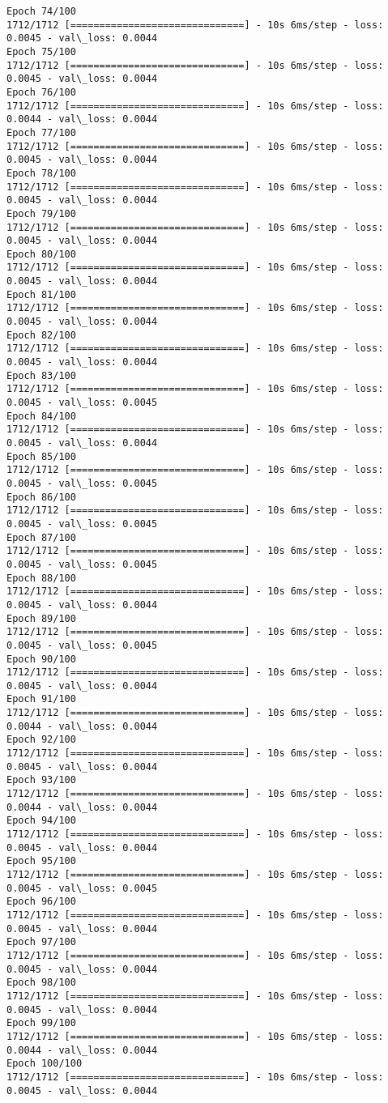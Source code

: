 \documentclass[11pt]{article}
\begin{document}
\begin{Verbatim}[commandchars=\\\{\}]
Epoch 74/100
1712/1712 [==============================] - 10s 6ms/step - loss: 0.0045 - val\_loss: 0.0044
Epoch 75/100
1712/1712 [==============================] - 10s 6ms/step - loss: 0.0045 - val\_loss: 0.0044
Epoch 76/100
1712/1712 [==============================] - 10s 6ms/step - loss: 0.0044 - val\_loss: 0.0044
Epoch 77/100
1712/1712 [==============================] - 10s 6ms/step - loss: 0.0045 - val\_loss: 0.0044
Epoch 78/100
1712/1712 [==============================] - 10s 6ms/step - loss: 0.0045 - val\_loss: 0.0044
Epoch 79/100
1712/1712 [==============================] - 10s 6ms/step - loss: 0.0045 - val\_loss: 0.0044
Epoch 80/100
1712/1712 [==============================] - 10s 6ms/step - loss: 0.0045 - val\_loss: 0.0044
Epoch 81/100
1712/1712 [==============================] - 10s 6ms/step - loss: 0.0045 - val\_loss: 0.0044
Epoch 82/100
1712/1712 [==============================] - 10s 6ms/step - loss: 0.0045 - val\_loss: 0.0044
Epoch 83/100
1712/1712 [==============================] - 10s 6ms/step - loss: 0.0045 - val\_loss: 0.0045
Epoch 84/100
1712/1712 [==============================] - 10s 6ms/step - loss: 0.0045 - val\_loss: 0.0044
Epoch 85/100
1712/1712 [==============================] - 10s 6ms/step - loss: 0.0045 - val\_loss: 0.0045
Epoch 86/100
1712/1712 [==============================] - 10s 6ms/step - loss: 0.0045 - val\_loss: 0.0045
Epoch 87/100
1712/1712 [==============================] - 10s 6ms/step - loss: 0.0045 - val\_loss: 0.0045
Epoch 88/100
1712/1712 [==============================] - 10s 6ms/step - loss: 0.0045 - val\_loss: 0.0044
Epoch 89/100
1712/1712 [==============================] - 10s 6ms/step - loss: 0.0045 - val\_loss: 0.0045
Epoch 90/100
1712/1712 [==============================] - 10s 6ms/step - loss: 0.0045 - val\_loss: 0.0044
Epoch 91/100
1712/1712 [==============================] - 10s 6ms/step - loss: 0.0044 - val\_loss: 0.0044
Epoch 92/100
1712/1712 [==============================] - 10s 6ms/step - loss: 0.0045 - val\_loss: 0.0044
Epoch 93/100
1712/1712 [==============================] - 10s 6ms/step - loss: 0.0044 - val\_loss: 0.0044
Epoch 94/100
1712/1712 [==============================] - 10s 6ms/step - loss: 0.0045 - val\_loss: 0.0044
Epoch 95/100
1712/1712 [==============================] - 10s 6ms/step - loss: 0.0045 - val\_loss: 0.0045
Epoch 96/100
1712/1712 [==============================] - 10s 6ms/step - loss: 0.0045 - val\_loss: 0.0044
Epoch 97/100
1712/1712 [==============================] - 10s 6ms/step - loss: 0.0045 - val\_loss: 0.0044
Epoch 98/100
1712/1712 [==============================] - 10s 6ms/step - loss: 0.0045 - val\_loss: 0.0044
Epoch 99/100
1712/1712 [==============================] - 10s 6ms/step - loss: 0.0044 - val\_loss: 0.0044
Epoch 100/100
1712/1712 [==============================] - 10s 6ms/step - loss: 0.0045 - val\_loss: 0.0044

    \end{Verbatim}
\end{document}
